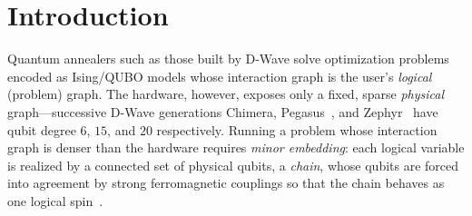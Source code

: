 \documentclass[acmsmall,anonymous,nonacm]{acmart}
\begin{document}

\maketitle

\section{Introduction}
\label{sec:intro}

Quantum annealers such as those built by D-Wave solve optimization problems
encoded as Ising/QUBO models whose interaction graph is the user's
\emph{logical} (problem) graph. The hardware, however, exposes only a fixed,
sparse \emph{physical} graph---successive D-Wave generations Chimera,
Pegasus~\cite{boothby2020pegasus}, and Zephyr~\cite{boothby2021zephyr} have qubit
degree $6$, $15$, and $20$ respectively. Running a problem
whose interaction graph is denser than the hardware requires \emph{minor
embedding}: each logical variable is realized by a connected set of physical
qubits, a \emph{chain}, whose qubits are forced into agreement by strong
ferromagnetic couplings so that the chain behaves as one logical
spin~\cite{cai2014minorminer,lucas2014ising}.
\end{document}
